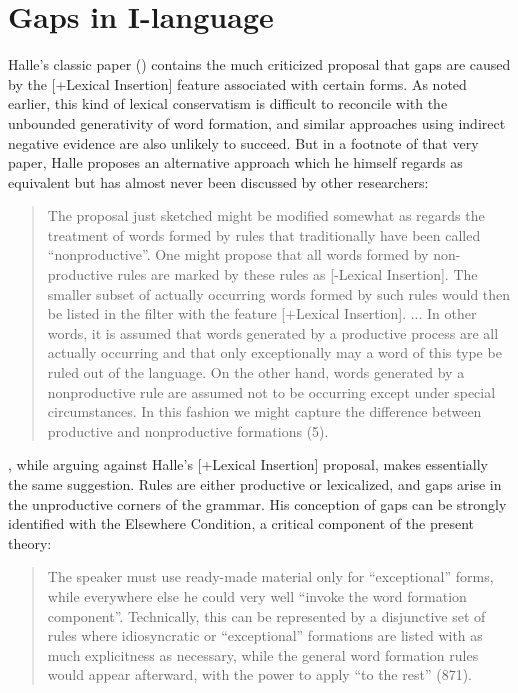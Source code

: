 \documentclass[output=paper,
modfonts
]{LSP/langsci}
\begin{document}
\section{Gaps in  I-language}
Halle's classic paper (\citeyear{Halle1973a}) contains the much
criticized proposal that gaps are caused by the [+Lexical Insertion]
feature associated with certain forms. As noted earlier, this kind of
lexical conservatism is difficult to reconcile with the unbounded
generativity of word formation, and similar approaches using indirect
negative evidence are also unlikely to succeed. But in a footnote
of that very paper, Halle proposes an alternative approach which he
himself regards as equivalent but has almost never been discussed by other
researchers:

\begin{quote}
The proposal just sketched might be modified somewhat as regards the
treatment of words formed by rules that traditionally have been called
``nonproductive''. One might propose that all words formed by
non-productive rules are marked by these rules as [-Lexical
Insertion]. The smaller subset of actually occurring words formed by 
such rules would then be listed in the filter with the feature
[+Lexical Insertion].  ... In other words, it is assumed that words
generated by a productive process are all actually occurring and that
only exceptionally may a word of this type be ruled out of the
language. On the other hand, words generated by a nonproductive rule
are assumed not to be occurring except under special circumstances. In
this fashion we might capture the difference between productive and
nonproductive formations (5). 
\end{quote}

\citet{Hetzron1975}, while arguing against Halle's [+Lexical
Insertion] proposal,  makes essentially the same suggestion. Rules
are either productive or lexicalized, and gaps arise in the
unproductive corners of the grammar. His conception of gaps can be
strongly identified with the Elsewhere Condition, a critical component
of the present theory:  
\begin{quote}
The speaker must use ready-made material only for ``exceptional'' forms,
while everywhere else he could very well ``invoke the word formation
component''. Technically, this can be represented by a disjunctive 
set of rules where idiosyncratic or ``exceptional'' formations are
listed with as much explicitness as necessary, while the general word
formation rules would appear afterward, with the power to apply 
``to the rest'' (871). 
\end{quote}
\end{document}
